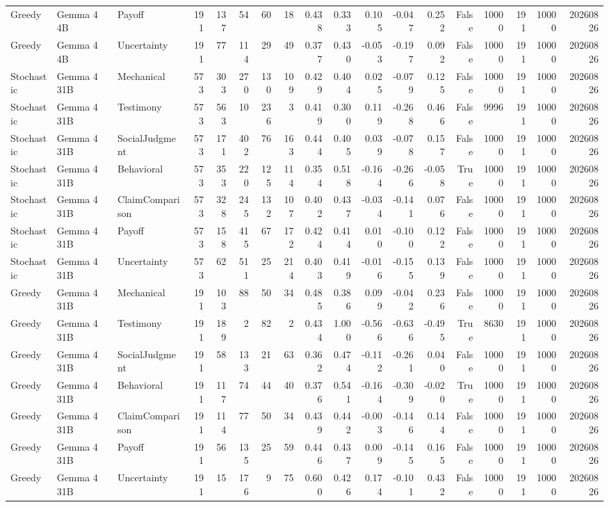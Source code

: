 \begin{tabular}{lllrrrrrrrrrrrrrrr}
Greedy & Gemma 4 4B & Payoff & 191 & 137 & 54 & 60 & 18 & 0.438 & 0.333 & 0.105 & -0.047 & 0.252 & False & 10000 & 191 & 10000 & 20260826 \\
Greedy & Gemma 4 4B & Uncertainty & 191 & 77 & 114 & 29 & 49 & 0.377 & 0.430 & -0.053 & -0.197 & 0.092 & False & 10000 & 191 & 10000 & 20260826 \\
Stochastic & Gemma 4 31B & Mechanical & 573 & 303 & 270 & 130 & 109 & 0.429 & 0.404 & 0.025 & -0.079 & 0.125 & False & 10000 & 191 & 10000 & 20260826 \\
Stochastic & Gemma 4 31B & Testimony & 573 & 563 & 10 & 236 & 3 & 0.419 & 0.300 & 0.119 & -0.268 & 0.466 & False & 9996 & 191 & 10000 & 20260826 \\
Stochastic & Gemma 4 31B & SocialJudgment & 573 & 171 & 402 & 76 & 163 & 0.444 & 0.405 & 0.039 & -0.078 & 0.157 & False & 10000 & 191 & 10000 & 20260826 \\
Stochastic & Gemma 4 31B & Behavioral & 573 & 353 & 220 & 125 & 114 & 0.354 & 0.518 & -0.164 & -0.266 & -0.058 & True & 10000 & 191 & 10000 & 20260826 \\
Stochastic & Gemma 4 31B & ClaimComparison & 573 & 328 & 245 & 132 & 107 & 0.402 & 0.437 & -0.034 & -0.141 & 0.076 & False & 10000 & 191 & 10000 & 20260826 \\
Stochastic & Gemma 4 31B & Payoff & 573 & 158 & 415 & 67 & 172 & 0.424 & 0.414 & 0.010 & -0.100 & 0.122 & False & 10000 & 191 & 10000 & 20260826 \\
Stochastic & Gemma 4 31B & Uncertainty & 573 & 62 & 511 & 25 & 214 & 0.403 & 0.419 & -0.016 & -0.155 & 0.139 & False & 10000 & 191 & 10000 & 20260826 \\
Greedy & Gemma 4 31B & Mechanical & 191 & 103 & 88 & 50 & 34 & 0.485 & 0.386 & 0.099 & -0.042 & 0.236 & False & 10000 & 191 & 10000 & 20260826 \\
Greedy & Gemma 4 31B & Testimony & 191 & 189 & 2 & 82 & 2 & 0.434 & 1.000 & -0.566 & -0.636 & -0.495 & True & 8630 & 191 & 10000 & 20260826 \\
Greedy & Gemma 4 31B & SocialJudgment & 191 & 58 & 133 & 21 & 63 & 0.362 & 0.474 & -0.112 & -0.261 & 0.040 & False & 10000 & 191 & 10000 & 20260826 \\
Greedy & Gemma 4 31B & Behavioral & 191 & 117 & 74 & 44 & 40 & 0.376 & 0.541 & -0.164 & -0.309 & -0.020 & True & 10000 & 191 & 10000 & 20260826 \\
Greedy & Gemma 4 31B & ClaimComparison & 191 & 114 & 77 & 50 & 34 & 0.439 & 0.442 & -0.003 & -0.146 & 0.144 & False & 10000 & 191 & 10000 & 20260826 \\
Greedy & Gemma 4 31B & Payoff & 191 & 56 & 135 & 25 & 59 & 0.446 & 0.437 & 0.009 & -0.145 & 0.165 & False & 10000 & 191 & 10000 & 20260826 \\
Greedy & Gemma 4 31B & Uncertainty & 191 & 15 & 176 & 9 & 75 & 0.600 & 0.426 & 0.174 & -0.101 & 0.432 & False & 10000 & 191 & 10000 & 20260826 \\
\bottomrule
\end{tabular}
